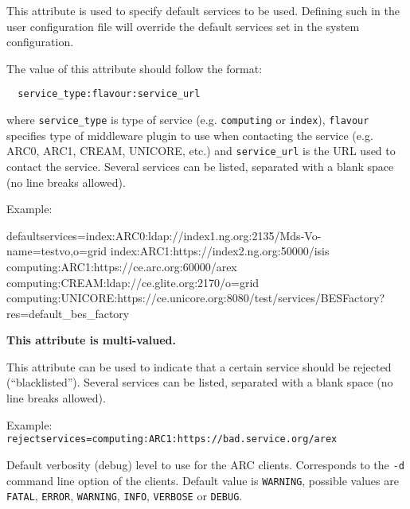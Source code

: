 This attribute is used to specify default services to be used. Defining such in
the user configuration file will override the default services set in the system
configuration.

The value of this attribute should follow the format:
\begin{verbatim}
  service_type:flavour:service_url
\end{verbatim}

where \texttt{service\_type} is type of service (e.g. \texttt{computing} or
\texttt{index}), \texttt{flavour} specifies type of middleware plugin to use
when contacting the service (e.g. ARC0, ARC1, CREAM, UNICORE, etc.) and
\texttt{service\_url} is the URL used to contact the service. Several services
can be listed, separated with a blank space (no line breaks allowed).

Example:
\begin{verbatim*}
defaultservices=index:ARC0:ldap://index1.ng.org:2135/Mds-Vo-name=testvo,o=grid
 index:ARC1:https://index2.ng.org:50000/isis
 computing:ARC1:https://ce.arc.org:60000/arex
 computing:CREAM:ldap://ce.glite.org:2170/o=grid
 computing:UNICORE:https://ce.unicore.org:8080/test/services/BESFactory?res=default_bes_factory
\end{verbatim*}

{}
\hspace*{0.5cm}
\begin{shaded}
\end{shaded}
\textbf{This attribute is multi-valued.}

This attribute can be used to indicate that a certain service should be
rejected (``blacklisted''). Several services can be listed, separated with a
blank space (no line breaks allowed).

Example:
\verb#    rejectservices=computing:ARC1:https://bad.service.org/arex#


 \hspace*{0.5cm}
 \begin{shaded}
 \end{shaded}
 Default verbosity (debug) level to use for the ARC clients. Corresponds to the
\verb#-d# command line option of the clients. Default value is \texttt{WARNING},
possible values are \texttt{FATAL}, \texttt{ERROR}, \texttt{WARNING},
\texttt{INFO}, \texttt{VERBOSE} or \texttt{DEBUG}.

